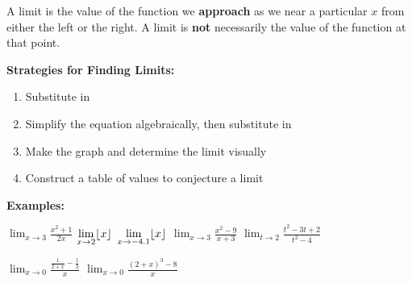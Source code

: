 \documentclass[addpoints, 12pt]{exam}
\DeclarePairedDelimiter\floor{\lfloor}{\rfloor}
\begin{document}
A limit is the value of the function we \textbf{approach} as we near a particular $x$ from either the left or the right. A limit is \textbf{not} necessarily the value of the function at that point.

\noindent\textbf{Strategies for Finding Limits:}
\begin{enumerate}
    \item Substitute in
    \item Simplify the equation algebraically, then substitute in
    \item Make the graph and determine the limit visually
    \item Construct a table of values to conjecture a limit
\end{enumerate}
\noindent\textbf{Examples:}
\begin{questions}
    \question $\displaystyle\lim_{x\to3}\frac{x^2+1}{2x}$ 
    \question $\displaystyle\lim_{x\to2}\floor*{x}$ 
    \question $\displaystyle\lim_{x\to-4.1}\floor*{x}$ 
    \question $\displaystyle\lim_{x\to3}\frac{x^2-9}{x+3}$ 
    \question $\displaystyle\lim_{t\to2}\frac{t^2-3t+2}{t^2-4}$ 

\newpage

    \question $\displaystyle\lim_{x\to0}\frac{\frac{1}{2+x}-\frac{1}{2}}{x}$ 
    \question $\displaystyle\lim_{x\to0}\frac{(2+x)^3-8}{x}$ 
\end{questions}

\end{document}
